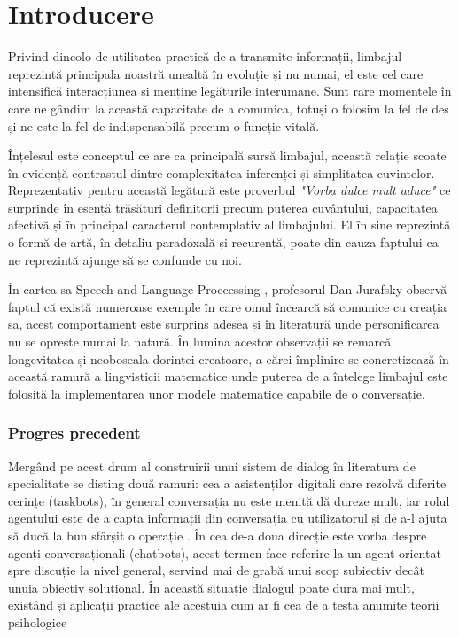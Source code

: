 \chapter{Introducere}


Privind dincolo de utilitatea practică de a transmite informații, limbajul reprezintă principala noastră unealtă în evoluție și nu numai, el este cel care intensifică interacțiunea și menține legăturile interumane. Sunt rare momentele în care ne gândim la această capacitate de a comunica, totuși o folosim la fel de des și ne este la fel de indispensabilă precum o funcție vitală.

Înțelesul este conceptul ce are ca principală sursă limbajul, această relație scoate în evidență contrastul dintre complexitatea inferenței și simplitatea cuvintelor. Reprezentativ pentru această legătură este proverbul \textit{"Vorba dulce mult aduce"} ce surprinde în esență trăsături definitorii precum puterea cuvântului, capacitatea afectivă și în principal caracterul contemplativ al limbajului. El în sine reprezintă o formă de artă, în detaliu paradoxală și recurentă, poate din cauza faptului ca ne reprezintă ajunge să se confunde cu noi.

În cartea sa Speech and Language Proccessing \cite{speach__lang_processing}, profesorul Dan Jurafsky observă faptul că există numeroase exemple în care omul încearcă să comunice cu creația sa, acest comportament este surprins adesea și în literatură unde personificarea nu se oprește numai la natură. În lumina acestor observații se remarcă longevitatea și neoboseala dorinței creatoare, a cărei împlinire se concretizează în această ramură a lingvisticii matematice unde puterea de a înțelege limbajul este folosită la implementarea unor modele matematice capabile de o conversație.

\subsection{Progres precedent}
Mergând pe acest drum al construirii unui sistem de dialog în literatura de specialitate se disting două ramuri: cea a asistenților digitali care rezolvă diferite cerințe (taskbots), în general conversația nu este menită dă dureze mult, iar rolul agentului este de a capta informații din conversația cu utilizatorul și de a-l ajuta să ducă la bun sfârșit o operație \cite{joint_online_bing, att_joint_bing}. În cea de-a doua direcție este vorba despre agenți conversaționali (chatbots), acest termen face referire la un agent orientat spre discuție la nivel general, servind mai de grabă unui scop subiectiv decât unuia obiectiv soluțional. În această situație dialogul poate dura mai mult, existând și aplicații practice ale acestuia cum ar fi cea de a testa anumite teorii psihologice \cite{weizenbaum}

